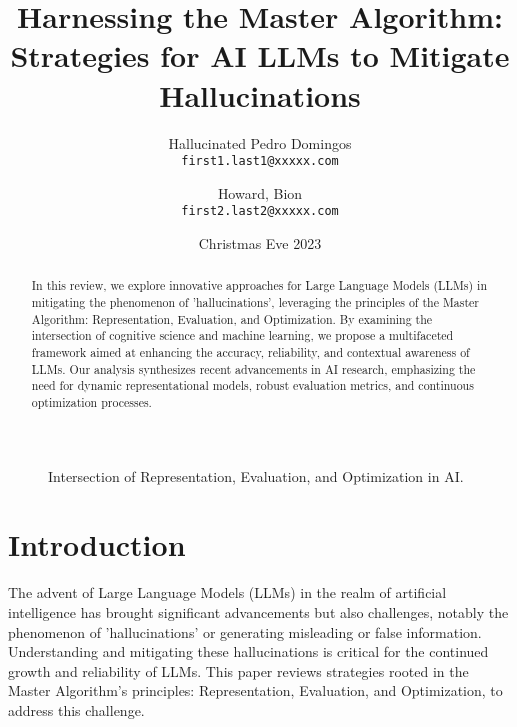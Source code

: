 \documentclass{article}
\title{Harnessing the Master Algorithm: Strategies for AI LLMs to Mitigate Hallucinations}
\author{
  Hallucinated Pedro Domingos\\
  \texttt{first1.last1@xxxxx.com}
  \and
  Howard, Bion\\
  \texttt{first2.last2@xxxxx.com}
}
\date{Christmas Eve 2023}
\begin{document}
\maketitle

\begin{figure}[h]
\centering
{}
\caption{Intersection of Representation, Evaluation, and Optimization in AI.}
\label{fig:master-algorithm-triangle}
\end{figure}

\begin{abstract}
In this review, we explore innovative approaches for Large Language Models (LLMs) in mitigating the phenomenon of 'hallucinations', leveraging the principles of the Master Algorithm: Representation, Evaluation, and Optimization. By examining the intersection of cognitive science and machine learning, we propose a multifaceted framework aimed at enhancing the accuracy, reliability, and contextual awareness of LLMs. Our analysis synthesizes recent advancements in AI research, emphasizing the need for dynamic representational models, robust evaluation metrics, and continuous optimization processes.
\end{abstract}

\newpage

\tableofcontents

\newpage

\section{Introduction}
The advent of Large Language Models (LLMs) in the realm of artificial intelligence has brought significant advancements but also challenges, notably the phenomenon of 'hallucinations' or generating misleading or false information. Understanding and mitigating these hallucinations is critical for the continued growth and reliability of LLMs. This paper reviews strategies rooted in the Master Algorithm's principles: Representation, Evaluation, and Optimization, to address this challenge.
\end{document}
